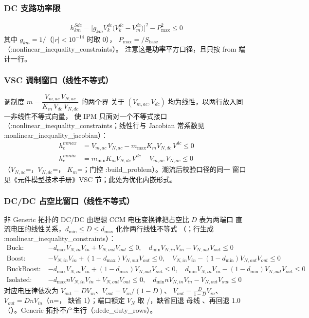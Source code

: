 \subsubsection*{DC 支路功率限}
\begin{align*}
h^{Sdc}_{km}=\Big[g_{km}V^{dc}_k\big(V^{dc}_k-V^{dc}_m\big)\Big]^2-P_{\max}^2\le 0
\end{align*}
其中 $g_{km}=1/$（$|r|<10^{-14}$ 时取 0），
$P_{\max}=$$/S_{\mathrm{base}}$（:nonlinear\_inequality\_constraints）。
注意这是\textbf{功率}平方口径，且只按 from 端计一行。

\subsubsection*{VSC 调制窗口（线性不等式）}
调制度 $m=\dfrac{V_{m,ac}\,V_{N,ac}}{K_m\,V_{dc}\,V_{N,dc}}$ 的两个界
关于 $(V_{m,ac},V_{dc})$ 均为线性，以两行放入同一非线性不等式向量，
使 IPM 只面对一个不等式接口（:nonlinear\_inequality\_constraints；线性行与 Jacobian 常系数见
:nonlinear\_inequality\_jacobian）：
\begin{align*}
h^{mmax}_c&=V_{m,ac}\,V_{N,ac}-m_{\max}K_mV_{N,dc}\,V^{dc}\le 0\\
h^{mmin}_c&=m_{\min}K_mV_{N,dc}\,V^{dc}-V_{m,ac}\,V_{N,ac}\le 0
\end{align*}
（$V_{N,ac}$=，$V_{N,dc}$=，
$K_m$=；门控 :build\_problem）。潮流后校验口径的同一
窗口见《元件模型技术手册》VSC 节；此处为优化内嵌形式。

\subsubsection*{DC/DC 占空比窗口（线性不等式）}
非 Generic 拓扑的 DC/DC 由理想 CCM 电压变换律把占空比 $D$ 表为两端口
直流电压的线性关系，$d_{\min}\le D\le d_{\max}$ 化作两行线性不等式
（；行生成 :nonlinear\_inequality\_constraints）：
\begin{align*}
\text{Buck:}\;&{-d_{\max}}V_{N,in}V_{in}+V_{N,out}V_{out}\le 0,\quad
 d_{\min}V_{N,in}V_{in}-V_{N,out}V_{out}\le 0\\
\text{Boost:}\;&{-V_{N,in}V_{in}}+(1-d_{\max})V_{N,out}V_{out}\le 0,\quad
 V_{N,in}V_{in}-(1-d_{\min})V_{N,out}V_{out}\le 0\\
\text{BuckBoost:}\;&{-d_{\max}V_{N,in}V_{in}}+(1-d_{\max})V_{N,out}V_{out}\le 0,\quad
 d_{\min}V_{N,in}V_{in}-(1-d_{\min})V_{N,out}V_{out}\le 0\\
\text{Isolated:}\;&{-d_{\max}nV_{N,in}V_{in}}+V_{N,out}V_{out}\le 0,\quad
 d_{\min}nV_{N,in}V_{in}-V_{N,out}V_{out}\le 0
\end{align*}
对应电压律依次为 $V_{out}=DV_{in}$、$V_{out}=V_{in}/(1-D)$、
$V_{out}=\tfrac{D}{1-D}V_{in}$、$V_{out}=DnV_{in}$（$n$=，
缺省 1）；端口额定 $V_N$ 取 /，缺省回退
母线 、再回退 1.0（）。Generic 拓扑不产生行（:dcdc\_duty\_rows）。

